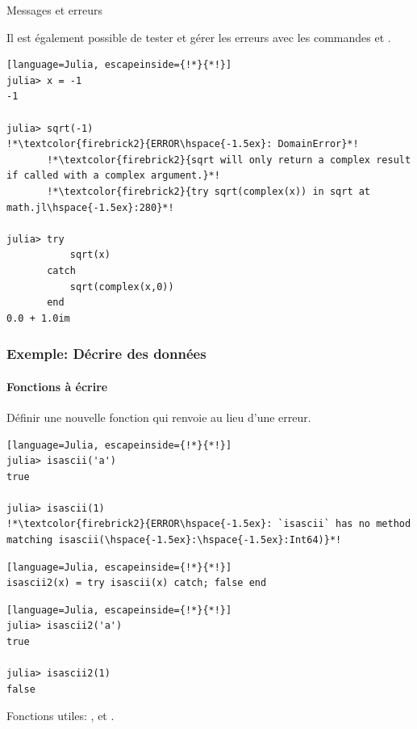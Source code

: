 \begin{frame}[containsverbatim]{Messages et erreurs}
\par{Il est également possible de tester et gérer les erreurs avec les commandes  et .}
\begin{lstlisting}[language=Julia, escapeinside={!*}{*!}]
julia> x = -1
-1

julia> sqrt(-1)
!*\textcolor{firebrick2}{ERROR\hspace{-1.5ex}: DomainError}*!
       !*\textcolor{firebrick2}{sqrt will only return a complex result if called with a complex argument.}*!
       !*\textcolor{firebrick2}{try sqrt(complex(x)) in sqrt at math.jl\hspace{-1.5ex}:280}*!

julia> try
           sqrt(x)
       catch
           sqrt(complex(x,0))
       end
0.0 + 1.0im
\end{lstlisting}
\end{frame}


\begin{frame}[fragile]
    \frametitle{\textcolor{goldenrod2}{Exemple:} Décrire des données}
    \framesubtitle{Fonctions à écrire}
\par{Définir une nouvelle fonction  qui renvoie  au lieu d'une erreur.}
\begin{lstlisting}[language=Julia, escapeinside={!*}{*!}]
julia> isascii('a')
true

julia> isascii(1)
!*\textcolor{firebrick2}{ERROR\hspace{-1.5ex}: `isascii` has no method matching isascii(\hspace{-1.5ex}:\hspace{-1.5ex}:Int64)}*!
\end{lstlisting}
\vspace{-2ex}
\begin{lstlisting}[language=Julia, escapeinside={!*}{*!}]
isascii2(x) = try isascii(x) catch; false end
\end{lstlisting}
\vspace{-3ex}
\begin{lstlisting}[language=Julia, escapeinside={!*}{*!}]
julia> isascii2('a')
true

julia> isascii2(1)
false
\end{lstlisting}
\par{Fonctions utiles: ,  et .}
\end{frame}


